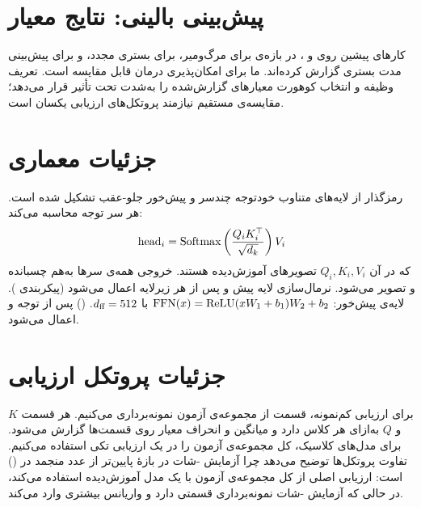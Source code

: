 \section{پیش‌بینی بالینی: نتایج معیار}

کارهای پیشین روی  و ،  در بازه‌ی  برای مرگ‌ومیر،  برای بستری مجدد، و  برای پیش‌بینی مدت بستری گزارش کرده‌اند.   ما برای امکان‌پذیری درمان قابل مقایسه است. تعریف وظیفه و انتخاب کوهورت معیارهای گزارش‌شده را به‌شدت تحت تأثیر قرار می‌دهد؛ مقایسه‌ی مستقیم نیازمند پروتکل‌های ارزیابی یکسان است.

\section{جزئیات معماری }

رمزگذار  از لایه‌های متناوب خودتوجه چندسر و پیش‌خور جلو-عقب تشکیل شده است. هر سر توجه محاسبه می‌کند:
\begin{equation}
\text{head}_i = \text{Softmax}\left(\frac{Q_i K_i^\top}{\sqrt{d_k}}\right) V_i
\end{equation}
که در آن $Q_i, K_i, V_i$ تصویرهای آموزش‌دیده هستند. خروجی همه‌ی سرها به‌هم چسبانده و تصویر می‌شود. نرمال‌سازی لایه پیش و پس از هر زیرلایه اعمال می‌شود (پیکربندی ). لایه‌ی پیش‌خور: $\text{FFN}(x) = \text{ReLU}(xW_1 + b_1)W_2 + b_2$ با $d_{\text{ff}} = 512$.  () پس از توجه و  اعمال می‌شود.

\section{جزئیات پروتکل ارزیابی}

برای ارزیابی کم‌نمونه،  قسمت از مجموعه‌ی آزمون نمونه‌برداری می‌کنیم. هر قسمت $K$  و $Q$  به‌ازای هر کلاس دارد و میانگین  و انحراف معیار روی قسمت‌ها گزارش می‌شود. برای مدل‌های کلاسیک، کل مجموعه‌ی آزمون را در یک ارزیابی تکی استفاده می‌کنیم. تفاوت پروتکل‌ها توضیح می‌دهد چرا  آزمایش -شات در بازۀ  پایین‌تر از عدد منجمد \texttt{} در  () است: ارزیابی اصلی از کل مجموعه‌ی آزمون با یک مدل آموزش‌دیده استفاده می‌کند، در حالی که آزمایش -شات نمونه‌برداری قسمتی دارد و واریانس بیشتری وارد می‌کند.

